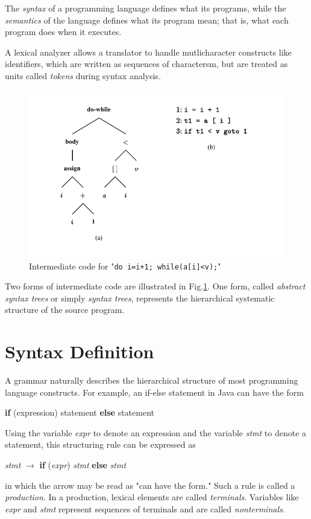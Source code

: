 \documentclass[a4paper,twoside]{book}
\begin{document}
The \textit{syntax} of a programming language defines what its programs, while the \textit{semantics} of the language defines what its program mean; that is, what each program does when it executes.

A lexical analyzer allows a translator to handle mutlicharacter constructs like identifiers, which are written as sequences of charactersm, but are treated as units called \textit{tokens} during syntax analysis.

\begin{figure}[htbp]
    \centering
    \includegraphics[width=\linewidth]{Figure2 4.pdf}
    \caption{Intermediate code for "\texttt{do i=i+1; while(a[i]<v);}"}
    \label{figure:2.4}
\end{figure}

Two forms of intermediate code are illustrated in Fig.\;\ref{figure:2.4}. One form, called \textit{abstract syntax trees} or simply \textit{syntax trees}, represents the hierarchical systematic structure of the source program.

\section{Syntax Definition}

A grammar naturally describes the hierarchical structure of most programming language constructs. For example, an if-else statement in Java can have the form
\begin{center}
    \textbf{if} (expression) statement \textbf{else} statement
\end{center}

Using the variable \textit{expr} to denote an expression and the variable \textit{stmt} to denote a statement, this structuring rule can be expressed as
\begin{center}
    \textit{stmt} $\rightarrow$ \textbf{if} (\textit{expr}) \textit{stmt} \textbf{else} \textit{stmt}
\end{center}
in which the arrow may be read as "can have the form." Such a rule is called a \textit{production}. In a production, lexical elements are called \textit{terminals}. Variables like \textit{expr} and \textit{stmt} represent sequences of terminals and are called \textit{nonterminals}.
\end{document}
